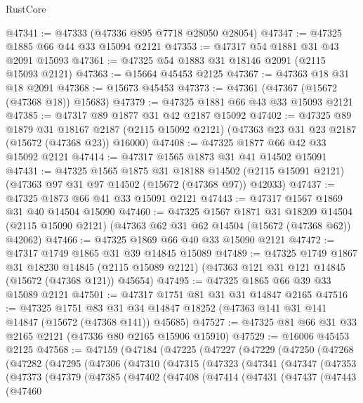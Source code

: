 \begin{lexlean}{RustCore}
\begin{coremodule}
@47341 := @47333 (@47336 @895 @7718 @28050 @28054)
@47347 := @47325 @1885 @66 @44 @33 @15094 @2121
@47353 := @47317 @54 @1881 @31 @43 @2091 @15093
@47361 := @47325 @54 @1883 @31 @18146 @2091 (@2115 @15093 @2121)
@47363 := @15664 @45453 @2125
@47367 := @47363 @18 @31 @18 @2091
@47368 := @15673 @45453
@47373 := @47361 (@47367 (@15672 (@47368 @18)) @15683)
@47379 := @47325 @1881 @66 @43 @33 @15093 @2121
@47385 := @47317 @89 @1877 @31 @42 @2187 @15092
@47402 := @47325
    @89
    @1879
    @31
    @18167
    @2187
    (@2115 @15092 @2121)
    (@47363 @23 @31 @23 @2187 (@15672 (@47368 @23)) @16000)
@47408 := @47325 @1877 @66 @42 @33 @15092 @2121
@47414 := @47317 @1565 @1873 @31 @41 @14502 @15091
@47431 := @47325
    @1565
    @1875
    @31
    @18188
    @14502
    (@2115 @15091 @2121)
    (@47363 @97 @31 @97 @14502 (@15672 (@47368 @97)) @42033)
@47437 := @47325 @1873 @66 @41 @33 @15091 @2121
@47443 := @47317 @1567 @1869 @31 @40 @14504 @15090
@47460 := @47325
    @1567
    @1871
    @31
    @18209
    @14504
    (@2115 @15090 @2121)
    (@47363 @62 @31 @62 @14504 (@15672 (@47368 @62)) @42062)
@47466 := @47325 @1869 @66 @40 @33 @15090 @2121
@47472 := @47317 @1749 @1865 @31 @39 @14845 @15089
@47489 := @47325
    @1749
    @1867
    @31
    @18230
    @14845
    (@2115 @15089 @2121)
    (@47363 @121 @31 @121 @14845 (@15672 (@47368 @121)) @45654)
@47495 := @47325 @1865 @66 @39 @33 @15089 @2121
@47501 := @47317 @1751 @81 @31 @31 @14847 @2165
@47516 := @47325
    @1751
    @83
    @31
    @34
    @14847
    @18252
    (@47363 @141 @31 @141 @14847 (@15672 (@47368 @141)) @45685)
@47527 := @47325 @81 @66 @31 @33 @2165 @2121 (@47336 @80 @2165 @15906 @15910)
@47529 := @16006 @45453 @2125
@47568 := @47159
    (@47184
      (@47225
        (@47227
          (@47229
            (@47250
              (@47268
                (@47282
                  (@47295
                    (@47306
                      (@47310
                        (@47315
                          (@47323
                            (@47341
                              (@47347
                                (@47353
                                  (@47373
                                    (@47379
                                      (@47385
                                        (@47402
                                          (@47408
                                            (@47414
                                              (@47431
                                                (@47437
                                                  (@47443
                                                    (@47460

\end{coremodule}
\end{lexlean}
